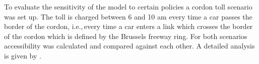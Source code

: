 To evaluate the sensitivity of the model to certain policies a cordon toll scenario was set up. The toll is charged between 6 and 10 am every time a car passes the border of the cordon, i.e.,\,every time a car enters a link which crosses the border of the cordon which is defined by the Brussels freeway ring. For both scenarios accessibility was calculated and compared against each other. A detailed analysis is given by \citet{RoederNagel2013SketchPlanningBrussels}.


